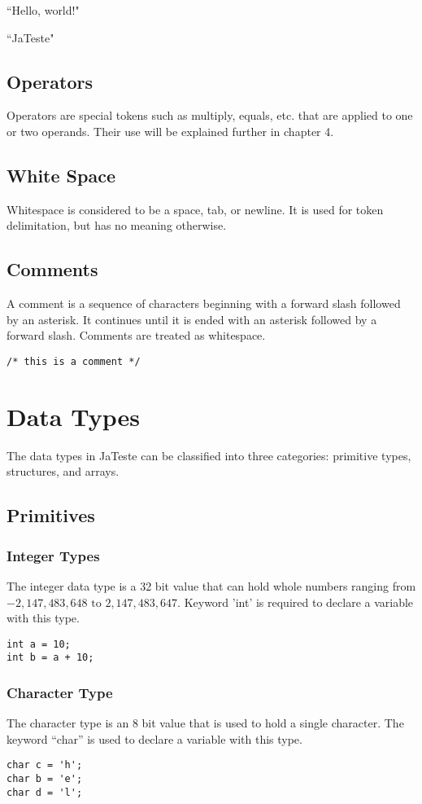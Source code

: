 \documentclass{article}
\begin{document}
``Hello, world!"

``JaTeste"

\subsection{Operators}
Operators are special tokens such as multiply, equals, etc. that are applied to one or two operands.  Their use will be explained further in chapter 4.

\subsection{White Space}
Whitespace is considered to be a space, tab, or newline. It is used for token delimitation, but has no meaning otherwise. 

\subsection{Comments}
A comment is a sequence of characters beginning with a forward slash followed by an asterisk. It continues until it is ended with an asterisk followed by a forward slash. Comments are treated as whitespace. 
\begin{lstlisting}
/* this is a comment */
\end{lstlisting}

\section{Data Types}
The data types in JaTeste can be classified into three categories: primitive types, structures, and arrays.

\subsection{Primitives}
\subsubsection{Integer Types}
The integer data type is a 32 bit value that can hold whole numbers ranging from $-2,147,483,648 \text{ to } 2,147,483,647$. Keyword 'int' is required to declare a variable with this type. 
\begin{lstlisting}
int a = 10;
int b = a + 10;
\end{lstlisting}

\subsubsection{Character Type}
The character type is an 8 bit value that is used to hold a single character. The keyword ``char'' is used to declare a variable with this type. 
\begin{lstlisting}
char c = 'h';
char b = 'e';
char d = 'l';
\end{lstlisting}
\end{document}

